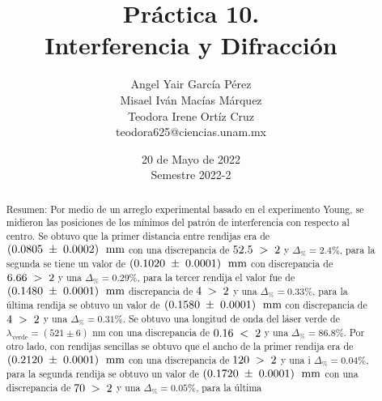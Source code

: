 \documentclass[DIV=calc, paper=a4, fontsize=10.5pt]{scrartcl}
\title{Práctica 10. \\ %
Interferencia y Difracción} %
\author{Angel Yair García Pérez \\
Misael Iván Macías Márquez\\
Teodora Irene Ortíz Cruz\\
\small{teodora625@ciencias.unam.mx}\\}
\date{20 de Mayo de 2022\\Semestre 2022-2}
\begin{document}
\maketitle
{}
\begin{abstract}

  \textcolor{carmine}{Resumen:} Por medio de un arreglo experimental basado en el experimento Young, se midieron las posiciones de los mínimos del patrón de interferencia con respecto al centro. Se obtuvo que la primer distancia entre rendijas era de $(0.0805\hspace{0.1cm}\pm\hspace{0.1cm}0.0002)\hspace{0.1cm}\text{ mm}$ con una discrepancia de $52.5\hspace{0.1cm}>\hspace{0.1cm}2$ y  $\Delta_{\%}=2.4\%$, para la segunda se tiene un valor de $(0.1020\hspace{0.1cm}\pm\hspace{0.1cm}0.0001)\hspace{0.1cm}\text{ mm}$ con discrepancia de $6.66\hspace{0.1cm}>\hspace{0.1cm}2$ y una $\Delta_{\%}=0.29\%$, para la tercer rendija el valor fue de $(0.1480\hspace{0.1cm}\pm\hspace{0.1cm}0.0001)\hspace{0.1cm}\text{ mm}$  discrepancia de $4\hspace{0.1cm}>\hspace{0.1cm}2$ y una $\Delta_{\%}=0.33\%$, para la última rendija se obtuvo un valor de $(0.1580\hspace{0.1cm}\pm\hspace{0.1cm}0.0001)\hspace{0.1cm}\text{ mm}$ con discrepancia de $4\hspace{0.1cm}>\hspace{0.1cm}2$ y una  $\Delta_{\%}=0.31\%$. Se obtuvo una longitud de onda del láser verde de  $\lambda_{\text{verde}} = (521 \pm 6) \text{ nm}$ con una discrepancia de $0.16\hspace{0.1cm}<\hspace{0.1cm}2$ y una $\Delta_{\%}=86.8\%$. Por otro lado, con rendijas sencillas se obtuvo que el ancho de la primer rendija era de $(0.2120\hspace{0.1cm}\pm\hspace{0.1cm}0.0001)\hspace{0.1cm}\text{ mm}$ con una discrepancia de $120\hspace{0.1cm}>\hspace{0.1cm}2$ y una i $\Delta_{\%}=0.04\%$, para la segunda rendija se obtuvo un valor de  $(0.1720\hspace{0.1cm}\pm\hspace{0.1cm}0.0001)\hspace{0.1cm}\text{ mm }$con una discrepancia de $70\hspace{0.1cm}>\hspace{0.1cm}2$ y una  $\Delta_{\%}=0.05\%$, para la última 
\end{abstract}
\end{document}
